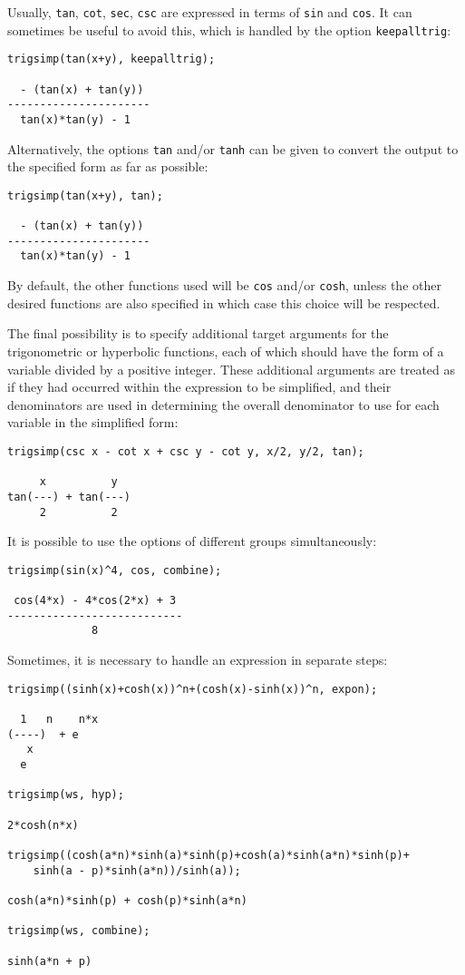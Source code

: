 Usually, \texttt{tan}, \texttt{cot}, \texttt{sec}, \texttt{csc} are
expressed in terms of \texttt{sin} and \texttt{cos}.  It can sometimes
be useful to avoid this, which is handled by the option
\texttt{keepalltrig}:
\begin{verbatim}
trigsimp(tan(x+y), keepalltrig);

  - (tan(x) + tan(y))
----------------------
  tan(x)*tan(y) - 1
\end{verbatim}
Alternatively, the options \texttt{tan} and/or \texttt{tanh} can be
given to convert the output to the specified form as far as possible:
\begin{verbatim}
trigsimp(tan(x+y), tan);

  - (tan(x) + tan(y))
----------------------
  tan(x)*tan(y) - 1
\end{verbatim}
By default, the other functions used will be \texttt{cos} and/or
\texttt{cosh}, unless the other desired functions are also specified
in which case this choice will be respected.

The final possibility is to specify additional target arguments for
the trigonometric or hyperbolic functions, each of which should have
the form of a variable divided by a positive integer.  These
additional arguments are treated as if they had occurred within the
expression to be simplified, and their denominators are used in
determining the overall denominator to use for each variable in the
simplified form:
\begin{verbatim}
trigsimp(csc x - cot x + csc y - cot y, x/2, y/2, tan);

     x          y
tan(---) + tan(---)
     2          2
\end{verbatim}

It is possible to use the options of different groups simultaneously:
\begin{verbatim}
trigsimp(sin(x)^4, cos, combine);

 cos(4*x) - 4*cos(2*x) + 3
---------------------------
             8
\end{verbatim}

Sometimes, it is necessary to handle an expression in separate steps:
\begin{verbatim}
trigsimp((sinh(x)+cosh(x))^n+(cosh(x)-sinh(x))^n, expon);

  1   n    n*x
(----)  + e
   x
  e

trigsimp(ws, hyp);

2*cosh(n*x)

trigsimp((cosh(a*n)*sinh(a)*sinh(p)+cosh(a)*sinh(a*n)*sinh(p)+
    sinh(a - p)*sinh(a*n))/sinh(a));

cosh(a*n)*sinh(p) + cosh(p)*sinh(a*n)

trigsimp(ws, combine);

sinh(a*n + p)
\end{verbatim}

